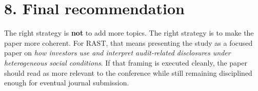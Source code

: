 \documentclass[11pt]{article}
\begin{document}
\section*{8. Final recommendation}

The right strategy is \textbf{not} to add more topics. The right strategy is to make the paper more coherent. For RAST, that means presenting the study as a focused paper on \emph{how investors use and interpret audit-related disclosures under heterogeneous social conditions}. If that framing is executed cleanly, the paper should read as more relevant to the conference while still remaining disciplined enough for eventual journal submission.
\end{document}
